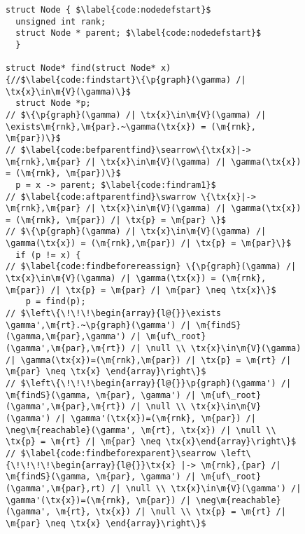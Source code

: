 \begin{figure}[t]
\vspace{-1ex}
  \begin{lstlisting}
struct Node { $\label{code:nodedefstart}$
  unsigned int rank;
  struct Node * parent; $\label{code:nodedefstart}$
  }

struct Node* find(struct Node* x) {//$\label{code:findstart}\{\p{graph}(\gamma) /| \tx{x}\in\m{V}(\gamma)\}$
  struct Node *p;
// $\{\p{graph}(\gamma) /| \tx{x}\in\m{V}(\gamma) /| \exists\m{rnk},\m{par}.~\gamma(\tx{x}) = (\m{rnk}, \m{par})\}$
// $\label{code:befparentfind}\searrow\{\tx{x}|-> \m{rnk},\m{par} /| \tx{x}\in\m{V}(\gamma) /| \gamma(\tx{x}) = (\m{rnk}, \m{par})\}$
  p = x -> parent; $\label{code:findram1}$
// $\label{code:aftparentfind}\swarrow \{\tx{x}|-> \m{rnk},\m{par} /| \tx{x}\in\m{V}(\gamma) /| \gamma(\tx{x}) = (\m{rnk}, \m{par}) /| \tx{p} = \m{par} \}$
// $\{\p{graph}(\gamma) /| \tx{x}\in\m{V}(\gamma) /| \gamma(\tx{x}) = (\m{rnk},\m{par}) /| \tx{p} = \m{par}\}$ 
  if (p != x) {
// $\label{code:findbeforereassign} \{\p{graph}(\gamma) /| \tx{x}\in\m{V}(\gamma) /| \gamma(\tx{x}) = (\m{rnk}, \m{par}) /| \tx{p} = \m{par} /| \m{par} \neq \tx{x}\}$
    p = find(p); 
// $\left\{\!\!\!\begin{array}{l@{}}\exists \gamma',\m{rt}.~\p{graph}(\gamma') /| \m{findS}(\gamma,\m{par},\gamma') /| \m{uf\_root}(\gamma',\m{par},\m{rt}) /| \null \\ \tx{x}\in\m{V}(\gamma) /| \gamma(\tx{x})=(\m{rnk},\m{par}) /| \tx{p} = \m{rt} /| \m{par} \neq \tx{x} \end{array}\right\}$
// $\left\{\!\!\!\begin{array}{l@{}}\p{graph}(\gamma') /| \m{findS}(\gamma, \m{par}, \gamma') /| \m{uf\_root}(\gamma',\m{par},\m{rt}) /| \null \\ \tx{x}\in\m{V}(\gamma') /| \gamma'(\tx{x})=(\m{rnk}, \m{par}) /| \neg\m{reachable}(\gamma', \m{rt}, \tx{x}) /| \null \\ \tx{p} = \m{rt} /| \m{par} \neq \tx{x}\end{array}\right\}$
// $\label{code:findbeforexparent}\searrow \left\{\!\!\!\!\begin{array}{l@{}}\tx{x} |-> \m{rnk},{par} /| \m{findS}(\gamma, \m{par}, \gamma') /| \m{uf\_root}(\gamma',\m{par},rt) /| \null \\ \tx{x}\in\m{V}(\gamma') /| \gamma'(\tx{x})=(\m{rnk}, \m{par}) /| \neg\m{reachable}(\gamma', \m{rt}, \tx{x}) /| \null \\ \tx{p} = \m{rt} /| \m{par} \neq \tx{x} \end{array}\right\}$

\end{lstlisting}
\end{figure}
